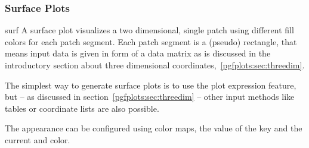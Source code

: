 \subsubsection{Surface Plots}
\label{sec:pgfplots:surfplots}
\begin{plottype}{surf}
	A surface plot visualizes a two dimensional, single patch using different fill colors for each patch segment. Each patch segment is a (pseudo) rectangle, that means input data is given in form of a data matrix as is discussed in the introductory section about three dimensional coordinates,~\ref{pgfplots:sec:threedim}.

\pgfplotsexpensiveexample
\begin{codeexample}[]
\end{codeexample}

	The simplest way to generate surface plots is to use the plot expression feature, but -- as discussed in section~\ref{pgfplots:sec:threedim} -- other input methods like tables or coordinate lists are also possible. 

	The appearance can be configured using color maps, the value of the  key and the current  and  color.

\pgfplotsexpensiveexample
\begin{codeexample}[]
\end{codeexample}

\pgfplotsexpensiveexample
\begin{codeexample}[]
\end{codeexample}

\pgfplotsexpensiveexample
\begin{codeexample}[]
\end{codeexample}


\end{plottype}
